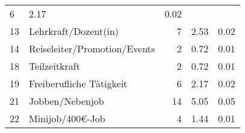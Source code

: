 \begin{longtable}{lXrrr}
       \num{6} &
       \num[round-mode=places,round-precision=2]{2.17} &
         \num[round-mode=places,round-precision=2]{0.02} \\

     13 &
     \multicolumn{1}{X}{ Lehrkraft/Dozent(in)   } &


       \num{7} &
       \num[round-mode=places,round-precision=2]{2.53} &
         \num[round-mode=places,round-precision=2]{0.02} \\

     14 &
     \multicolumn{1}{X}{ Reiseleiter/Promotion/Events   } &


       \num{2} &
       \num[round-mode=places,round-precision=2]{0.72} &
         \num[round-mode=places,round-precision=2]{0.01} \\

     18 &
     \multicolumn{1}{X}{ Teilzeitkraft   } &


       \num{2} &
       \num[round-mode=places,round-precision=2]{0.72} &
         \num[round-mode=places,round-precision=2]{0.01} \\

     19 &
     \multicolumn{1}{X}{ Freiberufliche Tätigkeit   } &


       \num{6} &
       \num[round-mode=places,round-precision=2]{2.17} &
         \num[round-mode=places,round-precision=2]{0.02} \\

     21 &
     \multicolumn{1}{X}{ Jobben/Nebenjob   } &


       \num{14} &
       \num[round-mode=places,round-precision=2]{5.05} &
         \num[round-mode=places,round-precision=2]{0.05} \\

     22 &
     \multicolumn{1}{X}{ Minijob/400€-Job   } &


       \num{4} &
       \num[round-mode=places,round-precision=2]{1.44} &
         \num[round-mode=places,round-precision=2]{0.01} \\


\end{longtable}
